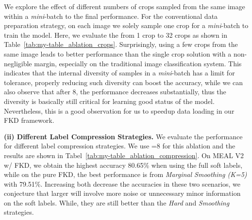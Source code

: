 \documentclass[10pt,twocolumn,letterpaper]{article}
\begin{document}
 We explore the effect of different numbers of crops sampled from the same image within a {\em mini}-batch to the final performance. For the conventional data preparation strategy, on each image we solely sample one crop for a {\em mini}-batch to train the model. Here, we evaluate the  from 1 crop to 32 crops as shown in Table~\ref{tab:my-table_ablation_crops}. Surprisingly, using a few crops from the same image leads to better performance than the single crop solution with a non-negligible margin, especially on the traditional image classification system. This indicates that the internal diversity of samples in a {\em mini}-batch has a limit for tolerance, properly reducing such diversity can boost the accuracy, while we can also observe that after 8, the performance decreases substantially, thus the diversity is basically still critical for learning good status of the model. Nevertheless, this is a good observation for us to speedup data loading in our FKD framework.


\begin{table*}[t]
\centering
\caption{Linear evaluation results of FKD with self-supervised Binary CNN (ReActNet~\cite{liu2020reactnet}), Real-valued CNN (ResNet-50~\cite{he2016deep}).}
\label{tab:my-table_SSL_ours_com}
\vspace{-0.1in}
\vspace{-0.1in}
\end{table*}

\textbf{(ii) Different Label Compression Strategies.} We evaluate the performance for different label compression strategies. We use =8 for this ablation and the results are shown in Tabel~\ref{tab:my-table_ablation_compression}. On MEAL V2 w/ FKD, we obtain the highest accuracy 80.65\% when using the full soft labels, while on the pure FKD, the best performance is from {\em Marginal Smoothing (K=5)} with 79.51\%. Increasing  both decrease the accuracies in these two scenarios, we conjecture that larger  will involve more noise or unnecessary minor information on the soft labels. While, they are still better than the {\em Hard} and {\em Smoothing} strategies.
\end{document}
